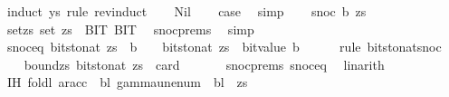 \begin{isabellebody}
\ {\isacharparenleft}{\kern0pt}induct\ ys\ rule{\isacharcolon}{\kern0pt}\ rev{\isacharunderscore}{\kern0pt}induct{\isacharparenright}{\kern0pt}\isanewline
\ \ \isamarkupfalse%
\ Nil\isanewline
\ \ \isamarkupfalse%
\ {\isacharquery}{\kern0pt}case\ \isamarkupfalse%
\ simp\isanewline
{}\isamarkupfalse%
\isanewline
\ \ \isamarkupfalse%
\ {\isacharparenleft}{\kern0pt}snoc\ b\ zs{\isacharparenright}{\kern0pt}\isanewline
\ \ \isamarkupfalse%
\ set{\isacharunderscore}{\kern0pt}zs{\isacharcolon}{\kern0pt}\ {\isachardoublequoteopen}set\ zs\ {\isasymsubseteq}\ {\isacharbraceleft}{\kern0pt}BIT{}{\isacharcomma}{\kern0pt}\ BIT{}{\isacharbraceright}{\kern0pt}{\isachardoublequoteclose}\ \isamarkupfalse%
\ snoc{\isachardot}{\kern0pt}prems{\isacharparenleft}{\kern0pt}{}{\isacharparenright}{\kern0pt}\ \isamarkupfalse%
\ simp\isanewline
\ \ \isamarkupfalse%
\ snoc{\isacharunderscore}{\kern0pt}eq{\isacharcolon}{\kern0pt}\ {\isachardoublequoteopen}bits{\isacharunderscore}{\kern0pt}to{\isacharunderscore}{\kern0pt}nat\ {\isacharparenleft}{\kern0pt}zs\ {\isacharat}{\kern0pt}\ {\isacharbrackleft}{\kern0pt}b{\isacharbrackright}{\kern0pt}{\isacharparenright}{\kern0pt}\ {\isacharequal}{\kern0pt}\ {}\ {\isacharasterisk}{\kern0pt}\ bits{\isacharunderscore}{\kern0pt}to{\isacharunderscore}{\kern0pt}nat\ zs\ {\isacharplus}{\kern0pt}\ bit{\isacharunderscore}{\kern0pt}value\ b{\isachardoublequoteclose}\isanewline
\ \ \ \ \isamarkupfalse%
\ {\isacharparenleft}{\kern0pt}rule\ bits{\isacharunderscore}{\kern0pt}to{\isacharunderscore}{\kern0pt}nat{\isacharunderscore}{\kern0pt}snoc{\isacharparenright}{\kern0pt}\isanewline
\ \ \isamarkupfalse%
\ bound{\isacharunderscore}{\kern0pt}zs{\isacharcolon}{\kern0pt}\ {\isachardoublequoteopen}bits{\isacharunderscore}{\kern0pt}to{\isacharunderscore}{\kern0pt}nat\ zs\ {\isacharless}{\kern0pt}\ card\ {\isasymGamma}{\isachardoublequoteclose}\isanewline
\ \ \ \ \isamarkupfalse%
\ snoc{\isachardot}{\kern0pt}prems{\isacharparenleft}{\kern0pt}{}{\isacharparenright}{\kern0pt}\ snoc{\isacharunderscore}{\kern0pt}eq\ \isamarkupfalse%
\ linarith\isanewline
\ \ \isamarkupfalse%
\ IH{\isacharcolon}{\kern0pt}\ {\isachardoublequoteopen}foldl\ {\isacharparenleft}{\kern0pt}ar{\isacharunderscore}{\kern0pt}acc\ {\isasymGamma}\ bl{\isacharparenright}{\kern0pt}\ {\isacharparenleft}{\kern0pt}gamma{\isacharunderscore}{\kern0pt}unenum\ {\isasymGamma}\ bl\ {}{\isacharparenright}{\kern0pt}\ zs\isanewline

\end{isabellebody}
